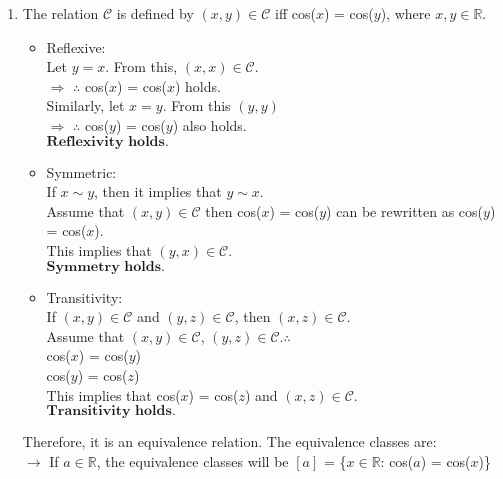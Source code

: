 \documentclass{article}
\newcommand{\R}{\mathbb{R}}
\begin{document}
\begin{enumerate}
\begin{enumerate}
    \item The relation $\mathcal{C}$ is defined by $(x,y)\in \mathcal{C}$ iff cos($x$) = cos($y$), 
    where $x,y \in \R$.
    \begin{itemize}
        \item Reflexive:\\ Let $y = x$. From this, $(x,x) \in \mathcal{C}$.\\ 
        $\Rightarrow$ $\therefore$ cos($x$) = cos($x$) holds.\\
        Similarly, let $x = y$. From this $(y,y)$\\ 
        $\Rightarrow$ $\therefore$ cos($y$) = cos($y$) also holds.\\$\textbf{Reflexivity holds.}$\\

        \item Symmetric:\\If $x \sim y$, then it implies that $y \sim x$.\\Assume that $(x,y) \in 
        \mathcal{C}$ then cos($x$) = cos($y$) can be rewritten as cos($y$) = cos($x$).\\This implies 
        that $(y,x) \in \mathcal{C}$.\\$\textbf{Symmetry holds.}$\\ 

        \item Transitivity:\\If $(x,y) \in \mathcal{C}$ and $(y,z) \in \mathcal{C}$, then $(x,z) \in \mathcal{C}$.\\
        Assume that $(x,y) \in \mathcal{C}$, $(y,z) \in \mathcal{C}$.$\therefore$\\
        cos($x$) = cos($y$)\\
        cos($y$) = cos($z$)\\
        This implies that cos($x$) = cos($z$) and $(x,z) \in \mathcal{C}$.\\$\textbf{Transitivity holds.}$\\
    \end{itemize}
    Therefore, it is an equivalence relation. The equivalence classes are:\\
    $\rightarrow$ If $a \in \R$, the equivalence classes will be $[a]$ = \{$x \in \R$: cos($a$) = cos($x$)\}\\


\end{enumerate}
\end{enumerate}
\end{document}
